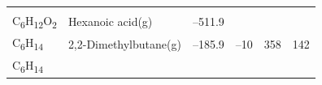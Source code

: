 \documentclass[
  9pt,
]{extbook}
\theoremstyle{definition}
\theoremstyle{definition}
\theoremstyle{definition}
\theoremstyle{remark}
\begin{document}
\begin{longtable}[]{@{}llllll@{}}
\begin{minipage}[t]{0.15\columnwidth}
\strut
\end{minipage} & \begin{minipage}[t]{0.14\columnwidth}\raggedright
\strut
\end{minipage} & \begin{minipage}[t]{0.14\columnwidth}\raggedright
\strut
\end{minipage}\tabularnewline
\begin{minipage}[t]{0.07\columnwidth}\raggedright
C\textsubscript{6}H\textsubscript{12}O\textsubscript{2}\strut
\end{minipage} & \begin{minipage}[t]{0.17\columnwidth}\raggedright
Hexanoic acid(g)\strut
\end{minipage} & \begin{minipage}[t]{0.15\columnwidth}\raggedright
--511.9\strut
\end{minipage} & \begin{minipage}[t]{0.15\columnwidth}\raggedright
\strut
\end{minipage} & \begin{minipage}[t]{0.14\columnwidth}\raggedright
\strut
\end{minipage} & \begin{minipage}[t]{0.14\columnwidth}\raggedright
\strut
\end{minipage}\tabularnewline
\begin{minipage}[t]{0.07\columnwidth}\raggedright
C\textsubscript{6}H\textsubscript{14}\strut
\end{minipage} & \begin{minipage}[t]{0.17\columnwidth}\raggedright
2,2-Dimethylbutane(g)\strut
\end{minipage} & \begin{minipage}[t]{0.15\columnwidth}\raggedright
--185.9\strut
\end{minipage} & \begin{minipage}[t]{0.15\columnwidth}\raggedright
--10\strut
\end{minipage} & \begin{minipage}[t]{0.14\columnwidth}\raggedright
358\strut
\end{minipage} & \begin{minipage}[t]{0.14\columnwidth}\raggedright
142\strut
\end{minipage}\tabularnewline
\begin{minipage}[t]{0.07\columnwidth}\raggedright
C\textsubscript{6}H\textsubscript{14}\strut
\end{minipage} & \begin{minipage}[t]{0.17\columnwidth}\raggedright

\end{minipage}
\end{longtable}
\end{document}
